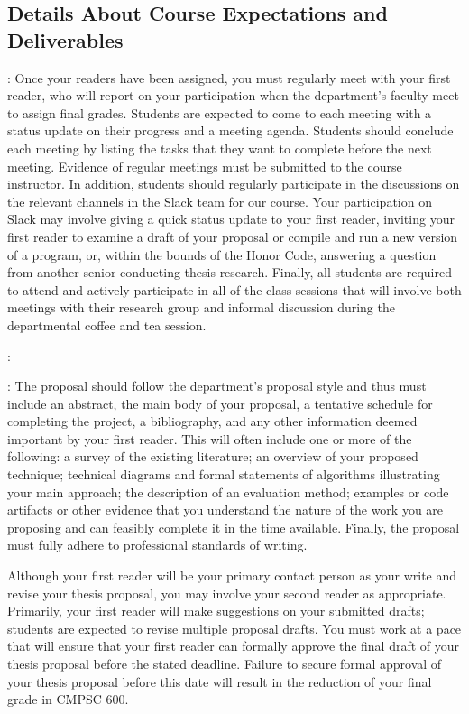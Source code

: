 \vspace*{-.15in}
\subsection*{Details About Course Expectations and Deliverables}

: Once your readers have been assigned, you must regularly meet with your first
reader, who will report on your participation when the department's faculty meet to assign final grades.  Students are
expected to come to each meeting with a status update on their progress and a meeting agenda.  Students should conclude
each meeting by listing the tasks that they want to complete before the next meeting. Evidence of regular meetings must
be submitted to the course instructor. In addition, students should regularly participate in the discussions on the
relevant channels in the Slack team for our course. Your participation on Slack may involve giving a quick status update
to your first reader, inviting your first reader to examine a draft of your proposal or compile and run a new version of
a program, or, within the bounds of the Honor Code, answering a question from another senior conducting thesis research.
Finally, all students are required to attend and actively participate in all of the class sessions that will involve
both meetings with their research group and informal discussion during the departmental coffee and tea session.

:

: The proposal should follow the department's proposal style and thus must include an
abstract, the main body of your proposal, a tentative schedule for completing the project, a bibliography, and any other
information deemed important by your first reader. This will often include one or more of the following: a survey of the
existing literature; an overview of your proposed technique; technical diagrams and formal statements of algorithms
illustrating your main approach; the description of an evaluation method; examples or code artifacts or other evidence that
you understand the nature of the work you are proposing and can feasibly complete it in the time available.  Finally, the
proposal must fully adhere to professional standards of writing.

Although your first reader will be your primary contact person as your write and revise your thesis proposal, you may
involve your second reader as appropriate. Primarily, your first reader will make suggestions on your submitted drafts;
students are expected to revise multiple proposal drafts.  You must work at a pace that will ensure that your first
reader can formally approve the final draft of your thesis proposal before the stated deadline.  Failure to secure formal
approval of your thesis proposal before this date will result in the reduction of your final grade in CMPSC 600.

